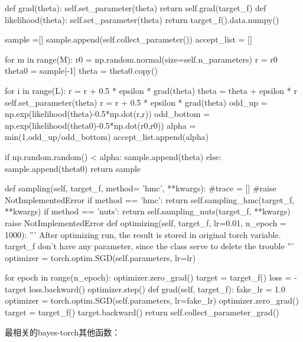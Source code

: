 \documentclass{sicnuthesis}
\begin{document}
\begin{python}
        def grad(theta):
            self.set_parameter(theta)
            return self.grad(target_f)
        def likelihood(theta):
            self.set_parameter(theta)
            return target_f().data.numpy()
        
        sample =[]
        sample.append(self.collect_parameter())
        accept_list = []
        
        for m in range(M):
            r0 = np.random.normal(size=self.n_parameters)
            r = r0
            theta0 = sample[-1]
            theta = theta0.copy()
            
            for i in range(L):
                r = r + 0.5 * epsilon * grad(theta)
                theta = theta + epsilon * r
                self.set_parameter(theta)
                r = r + 0.5 * epsilon * grad(theta)
            odd_up = np.exp(likelihood(theta)-0.5*np.dot(r,r))
            odd_bottom = np.exp(likelihood(theta0)-0.5*np.dot(r0,r0))
            alpha = min(1,odd_up/odd_bottom)
            accept_list.append(alpha)
            
            if np.random.random() < alpha:
                sample.append(theta)
            else:
                sample.append(theta0)
        return sample
        

    def sampling(self, target_f, method= 'hmc', **kwargs):
        #trace = []
        #raise NotImplementedError
        if method == 'hmc':
            return self.sampling_hmc(target_f, **kwargs)
        if method == 'nuts':
            return self.sampling_nuts(target_f, **kwargs)
        raise NotImplementedError
    def optimizing(self, target_f, lr=0.01, n_epoch = 1000):
        '''
        After optimizing run, the result is stored in original torch variable.
        target_f don't have any parameter, since the class serve to delete the trouble
        '''
        optimizer = torch.optim.SGD(self.parameters, lr=lr)
        
        for epoch in range(n_epoch):
            optimizer.zero_grad()
            target = target_f()
            loss = -target
            loss.backward()
            optimizer.step()
    def grad(self, target_f):
        fake_lr = 1.0
        optimizer = torch.optim.SGD(self.parameters, lr=fake_lr)
        optimizer.zero_grad()
        target = target_f()
        target.backward()
        return self.collect_parameter_grad()

\end{python}


最相关的bayes-torch其他函数：
\end{document}
